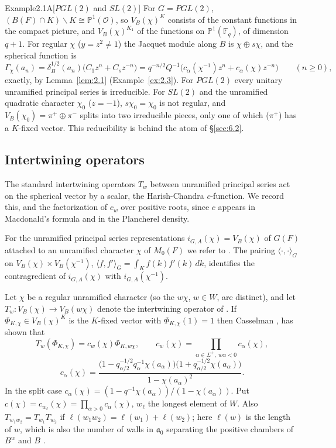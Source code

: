 \documentclass[12pt,letterpaper]{article}
\numberwithin{equation}{section}
\theoremstyle{plain}
\theoremstyle{remark}
\theoremstyle{plain}
\theoremstyle{definition}
\theoremstyle{remark}
\newcounter{rtw}
\theoremstyle{remark}
\newcommand{\OO}{\mathcal{O}}
\newcommand{\fa}{\mathfrak{a}}
\newcommand{\ip}[1]{\langle #1\rangle}
\begin{document}
\begin{fixedrem}{Example}{2.1A}[$PGL(2)$ and $SL(2)$]\label{ex:2.1A}
For $G=PGL(2)$, $(B(F)\cap K)\backslash K\cong\mathbb{P}^1(\OO)$, so $V_B(\chi)^K$ consists of the constant functions in the compact picture, and $V_B(\chi)^{K_1}$ of the functions on $\mathbb{P}^1(\mathbb{F}_q)$, of dimension $q+1$. For regular $\chi$ ($y=z^2\ne1$) the Jacquet module along $B$ is $\chi\oplus s\chi$, and the spherical function is
\[
\Gamma_\chi(a_n)=\delta_B^{1/2}(a_n)\big(C_1z^n+C_sz^{-n}\big)=q^{-n/2}Q^{-1}\big(c_\alpha(\chi^{-1})z^n+c_\alpha(\chi)z^{-n}\big)\qquad(n\ge0),
\]
exactly, by Lemma~\ref{lem:2.1} (Example~\ref{ex:2.3}). For $PGL(2)$ every unitary unramified principal series is irreducible. For $SL(2)$ and the unramified quadratic character $\chi_0$ ($z=-1$), $s\chi_0=\chi_0$ is not regular, and $V_B(\chi_0)=\pi^+\oplus\pi^-$ splits into two irreducible pieces, only one of which ($\pi^+$) has a $K$-fixed vector. This reducibility is behind the atom of \S\ref{sec:6.2}.
\end{fixedrem}

\subsection{Intertwining operators}\label{sec:2.2}

The standard intertwining operators $T_w$ between unramified principal series act on the spherical vector by a scalar, the Harish-Chandra $c$-function. We record this, and the factorization of $c_w$ over positive roots, since $c$ appears in Macdonald's formula and in the Plancherel density.


For the unramified principal series representations $i_{G,A}(\chi)=V_B(\chi)$ of $G(F)$ attached to an unramified character $\chi$ of $M_0(F)$ we refer to \cite{Ca79}. The pairing $\ip{\cdot,\cdot}_G$ on $V_B(\chi)\times V_B(\chi^{-1})$, $\ip{f,f'}_G=\int_Kf(k)f'(k)\,dk$, identifies the contragredient of $i_{G,A}(\chi)$ with $i_{G,A}(\chi^{-1})$.

Let $\chi$ be a regular unramified character (so the $w\chi$, $w\in W$, are distinct), and let $T_w:V_B(\chi)\to V_B(w\chi)$ denote the intertwining operator of \cite{Ca79}. If $\Phi_{K,\chi}\in V_B(\chi)^K$ is the $K$-fixed vector with $\Phi_{K,\chi}(1)=1$ then Casselman \cite[Thm.~3.1]{Ca80}, \cite[Thm.~3.9]{Ca79} has shown that
\begin{equation}\label{eq:2.8}
T_w(\Phi_{K,\chi})=c_w(\chi)\Phi_{K,w\chi},\qquad c_w(\chi)=\prod_{\alpha\in\Sigma^+,\ w\alpha<0}c_\alpha(\chi),
\end{equation}
\[
c_\alpha(\chi)=\frac{\big(1-q_{\alpha/2}^{-1/2}q_\alpha^{-1}\chi(a_\alpha)\big)\big(1+q_{\alpha/2}^{-1/2}\chi(a_\alpha)\big)}{1-\chi(a_\alpha)^2}.
\]
In the split case $c_\alpha(\chi)=(1-q^{-1}\chi(a_\alpha))/(1-\chi(a_\alpha))$. Put $c(\chi)=c_{w_\ell}(\chi)=\prod_{\alpha>0}c_\alpha(\chi)$, $w_\ell$ the longest element of $W$. Also $T_{w_1w_2}=T_{w_1}T_{w_2}$ if $\ell(w_1w_2)=\ell(w_1)+\ell(w_2)$; here $\ell(w)$ is the length of $w$, which is also the number of walls in $\fa_0$ separating the positive chambers of $B^w$ and $B$ \cite[ch.~1]{Ca95}.
\end{document}
